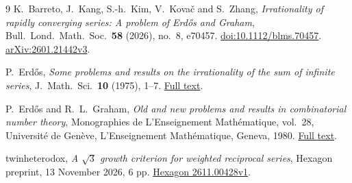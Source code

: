 \documentclass[11pt]{article}
\numberwithin{equation}{section}
\begin{document}
\begin{thebibliography}{9}
K.~Barreto, J.~Kang, S.-h.~Kim, V.~Kova\v{c} and S.~Zhang,
\emph{Irrationality of rapidly converging series: A problem of
Erd\H{o}s and Graham},
Bull.\ Lond.\ Math.\ Soc.\ \textbf{58} (2026), no.~8, e70457.
\href{https://doi.org/10.1112/blms.70457}{doi:10.1112/blms.70457}.
\href{https://arxiv.org/abs/2601.21442v3}{arXiv:2601.21442v3}.

P.~Erd\H{o}s,
\emph{Some problems and results on the irrationality of the sum of
infinite series},
J.\ Math.\ Sci.\ \textbf{10} (1975), 1--7.
\href{https://www.renyi.hu/~p_erdos/1976-44.pdf}{Full text}.

P.~Erd\H{o}s and R.~L.~Graham,
\emph{Old and new problems and results in combinatorial number theory},
Monographies de L'Enseignement Math\'ematique, vol.~28,
Universit\'e de Gen\`eve, L'Enseignement Math\'ematique, Geneva, 1980.
\href{https://mathweb.ucsd.edu/~ronspubs/80_11_number_theory.pdf}{Full text}.

twinheterodox,
\emph{A $\sqrt3$ growth criterion for weighted reciprocal series},
Hexagon preprint, 13 November 2026, 6 pp.
\href{https://hexagonmath.org/2611.00428v1}{Hexagon 2611.00428v1}.
\end{thebibliography}
\end{document}
